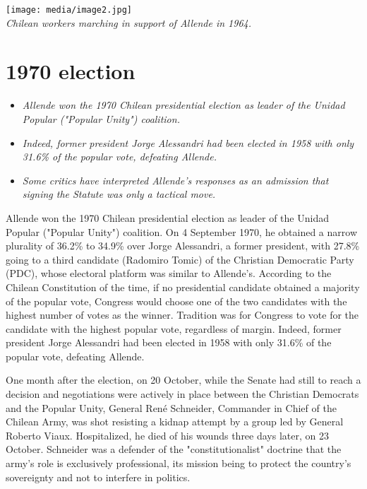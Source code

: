 \texttt{[image: media/image2.jpg]}\\
\emph{Chilean workers marching in support of Allende in 1964.}

\section{1970 election}\label{election}

\begin{itemize}
\item
  \emph{Allende won the 1970 Chilean presidential election as leader of
  the Unidad Popular ("Popular Unity") coalition.}
\item
  \emph{Indeed, former president Jorge Alessandri had been elected in
  1958 with only 31.6\% of the popular vote, defeating Allende.}
\item
  \emph{Some critics have interpreted Allende's responses as an
  admission that signing the Statute was only a tactical move.}
\end{itemize}

Allende won the 1970 Chilean presidential election as leader of the
Unidad Popular ("Popular Unity") coalition. On 4 September 1970, he
obtained a narrow plurality of 36.2\% to 34.9\% over Jorge Alessandri, a
former president, with 27.8\% going to a third candidate (Radomiro
Tomic) of the Christian Democratic Party (PDC), whose electoral platform
was similar to Allende's. According to the Chilean Constitution of the
time, if no presidential candidate obtained a majority of the popular
vote, Congress would choose one of the two candidates with the highest
number of votes as the winner. Tradition was for Congress to vote for
the candidate with the highest popular vote, regardless of margin.
Indeed, former president Jorge Alessandri had been elected in 1958 with
only 31.6\% of the popular vote, defeating Allende.

One month after the election, on 20 October, while the Senate had still
to reach a decision and negotiations were actively in place between the
Christian Democrats and the Popular Unity, General René Schneider,
Commander in Chief of the Chilean Army, was shot resisting a kidnap
attempt by a group led by General Roberto Viaux. Hospitalized, he died
of his wounds three days later, on 23 October. Schneider was a defender
of the "constitutionalist" doctrine that the army's role is exclusively
professional, its mission being to protect the country's sovereignty and
not to interfere in politics.

